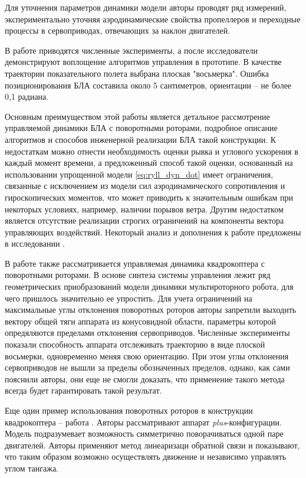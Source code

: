Для уточнения параметров динамики модели авторы проводят ряд измерений, экспериментально уточняя аэродинамические свойства пропеллеров и переходные процессы в сервоприводах, отвечающих за наклон двигателей.

В работе приводятся численные эксперименты, а после исследователи демонстрируют воплощение алгоритмов управления в прототипе.
В качестве траектории показательного полета выбрана плоская "восьмерка".
Ошибка позиционирования БЛА составила около 5 сантиметров, ориентации -- не более 0,1 радиана.

Основным преимуществом этой работы является детальное рассмотрение управляемой динамики БЛА с поворотными роторами, подробное описание алгоритмов и способов инженерной реализации БЛА такой конструкции.
К недостаткам можно отнести необходимость оценки рывка и углового ускорения в каждый момент времени, а предложенный способ такой оценки, основанный на использовании упрощенной модели \eqref{eq:ryll_dyn_dot} имеет ограничения, связанные с исключением из модели сил аэродинамического сопротивления и гироскопических моментов, что может приводить к значительным ошибкам при некоторых условиях, например, наличии порывов ветра. Другим недостатком является отсутствие реализации строгих ограничений на компоненты вектора управляющих воздействий. Некоторый анализ и дополнения к работе \cite{Ryll01} предложены в исследовании \cite{Stolc01}.

В работе  \cite{Invernizzi01} также рассматривается управляемая динамика квадрокоптера с поворотными роторами. В основе синтеза системы управления лежит ряд геометрических приобразований модели динамики мультироторного робота, для чего пришлось значительно ее упростить.
Для учета ограничений на максимальные углы отклонения поворотных роторов авторы запретили выходить вектору общей тяги аппарата из конусовидной области, параметры которой опредяляются пределами отклонения сервоприводов.
Численные эксперименты показали способность аппарата отслеживать траекторию в виде плоской восьмерки, одновременно меняя свою ориентацию.
При этом углы отклонения сервоприводов не вышли за пределы обозначенных пределов, однако, как сами пояснили авторы, они еще не смогли доказать, что применение такого метода всегда будет гарантировать такой результат.

Еще один пример использования поворотных роторов в конструкции квадрокоптера -- работа \cite{Nemati01}.
Авторы рассматривают аппарат \textit{plus}-конфигурации.
Модель подразумевает возможность симметрично поворачиваться одной паре двигателей.
Авторы применяют метод линеаризаци обратной связи и показывают, что таким образом возможно осуществлять движение и независимо управлять углом тангажа.

